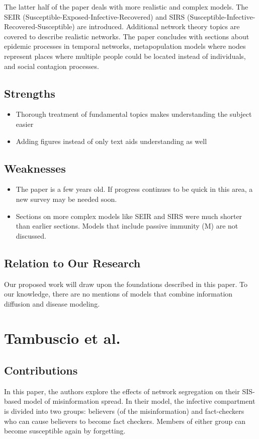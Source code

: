 \documentclass{article}
\begin{document}
    The latter half of the paper deals with more realistic and complex models. The SEIR (Susceptible-Exposed-Infective-Recovered) and SIRS (Susceptible-Infective-Recovered-Susceptible) are introduced. Additional network theory topics are covered to describe realistic networks. The paper concludes with sections about epidemic processes in temporal networks, metapopulation models where nodes represent places where multiple people could be located instead of individuals, and social contagion processes. 
    
    \subsection{Strengths}
    \begin{itemize}
        \item Thorough treatment of fundamental topics makes understanding the subject easier
        \item Adding figures instead of only text aids understanding as well
    \end{itemize}
    
    \subsection{Weaknesses}
    \begin{itemize}
        \item The paper is a few years old. If progress continues to be quick in this area, a new survey may be needed soon.
        \item Sections on more complex models like SEIR and SIRS were much shorter than earlier sections. Models that include passive immunity (M) are not discussed.
    \end{itemize}
    
    \subsection{Relation to Our Research}
    Our proposed work will draw upon the foundations described in this paper. To our knowledge, there are no mentions of models that combine information diffusion and disease modeling.

\section{Tambuscio et al.}
    \subsection{Contributions}
    In this paper, the authors explore the effects of network segregation on their SIS-based model of misinformation spread. In their model, the infective compartment is divided into two groups: believers (of the misinformation) and fact-checkers who can cause believers to become fact checkers. Members of either group can become susceptible again by forgetting.
    
\end{document}
